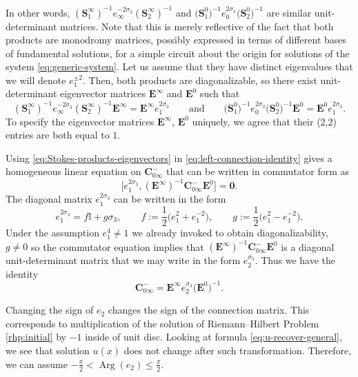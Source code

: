 \documentclass[pdftex]{sigma}
\numberwithin{equation}{section}
\renewcommand{\arg}{\operatorname{Arg}}
\begin{document}
 In other words, $ (\mathbf{S}^\infty_{1})^{-1}e_\infty^{-2\sigma_3}(\mathbf{S}_{2}^\infty )^{-1}$ and $\big(\mathbf{S}^0_{1}\big)^{-1}e_0^{2\sigma_3}\big(\mathbf{S}_{2}^0 \big)^{-1}$ are similar unit-determinant matrices. Note that this is merely reflective of the fact that both products are monodromy matrices, possibly expressed in terms of different bases of fundamental solutions, for a simple circuit about the origin for solutions of the system \eqref{eq:generic-system}. Let us assume that they have distinct eigenvalues that we will denote $e_1^{\pm 2}$. Then, both products are diagonalizable, so there exist unit-determinant eigenvector matrices $\mathbf{E}^\infty$ and $\mathbf{E}^0$ such that
 \begin{equation}
 (\mathbf{S}^\infty_{1})^{-1}e_\infty^{-2\sigma_3}(\mathbf{S}_{2}^\infty )^{-1}\mathbf{E}^\infty=\mathbf{E}^\infty e_1^{2\sigma_3}\qquad\text{and}\qquad
 \big(\mathbf{S}^0_{1}\big)^{-1}e_0^{2\sigma_3}\big(\mathbf{S}_{2}^0 \big)^{-1}\mathbf{E}^0=\mathbf{E}^0 e_1^{2\sigma_3}.
 \label{eq:Stokes-products-eigenvectors}
 \end{equation}
To specify the eigenvector matrices $\mathbf{E}^\infty$, $\mathbf{E}^0$ uniquely, we agree that their (2,2) entries are both equal to $1$.


 Using \eqref{eq:Stokes-products-eigenvectors} in \eqref{eq:left-connection-identity} gives a homogeneous linear equation on $\mathbf{C}_{0\infty}^-$ that can be written in commutator form as
 \begin{equation*}
 \big[e_1^{2\sigma_3},(\mathbf{E}^\infty)^{-1}\mathbf{C}_{0\infty}^-\mathbf{E}^0\big]=\mathbf{0}.
 \end{equation*}
 The diagonal matrix $e_1^{2\sigma_3}$ can be written in the form
 \begin{equation*}
 e_1^{2\sigma_3}=f\mathbb{I}+g\sigma_3,\qquad f:= \frac{1}{2}\big(e_1^2+e_1^{-2}\big),\qquad g:=\frac{1}{2}\big(e_1^2-e_1^{-2}\big).
 \end{equation*}
 Under the assumption $e_1^4\neq 1$ we already invoked to obtain diagonalizability, $g\neq 0$ so the commutator equation implies that $(\mathbf{E}^\infty)^{-1}\mathbf{C}_{0\infty}^-\mathbf{E}^0$ is a diagonal unit-determinant matrix that we may write in the form $e_2^{\sigma_3}$. Thus we have the identity
 \begin{equation}
 \label{eq:C-zero-infty-diagonalization}
 \mathbf{C}_{0\infty}^-=\mathbf{E}^\infty e_2^{\sigma_3}\big(\mathbf{E}^0\big)^{-1}.
 \end{equation}
 \begin{Remark}\label{remark:change-sign-e2}
 Changing the sign of $e_2$ changes the sign of the connection matrix. This corresponds to multiplication of the solution of Riemann--Hilbert Problem \ref{rhp:initial} by $-1$ inside of unit disc. Looking at formula \eqref{eq:u-recover-general}, we see that solution $u(x)$ does not change after such transformation. Therefore, we can assume $-\frac{\pi}{2}<\arg(e_2)\leq\frac{\pi}{2}$.
 \end{Remark}
\end{document}
